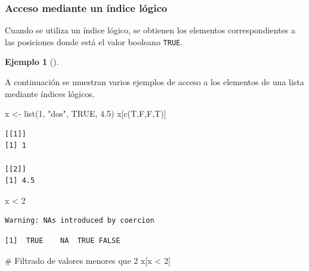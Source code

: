 \documentclass[
  a4paper,
]{scrreport}
\newenvironment{Shaded}{\begin{snugshade}}{\end{snugshade}}
\newcommand{\CommentTok}[1]{\textcolor[rgb]{0.37,0.37,0.37}{#1}}
\newcommand{\ConstantTok}[1]{\textcolor[rgb]{0.56,0.35,0.01}{#1}}
\newcommand{\DecValTok}[1]{\textcolor[rgb]{0.68,0.00,0.00}{#1}}
\newcommand{\FloatTok}[1]{\textcolor[rgb]{0.68,0.00,0.00}{#1}}
\newcommand{\FunctionTok}[1]{\textcolor[rgb]{0.28,0.35,0.67}{#1}}
\newcommand{\NormalTok}[1]{\textcolor[rgb]{0.00,0.23,0.31}{#1}}
\newcommand{\OtherTok}[1]{\textcolor[rgb]{0.00,0.23,0.31}{#1}}
\newcommand{\SpecialCharTok}[1]{\textcolor[rgb]{0.37,0.37,0.37}{#1}}
\newcommand{\StringTok}[1]{\textcolor[rgb]{0.13,0.47,0.30}{#1}}
\theoremstyle{definition}
\theoremstyle{definition}
\newtheorem{example}{Ejemplo}[chapter]
\theoremstyle{remark}
\begin{document}
\hypertarget{acceso-mediante-un-uxedndice-luxf3gico-1}{%
\subsubsection{Acceso mediante un índice
lógico}\label{acceso-mediante-un-uxedndice-luxf3gico-1}}

Cuando se utiliza un índice lógico, se obtienen los elementos
correspondientes a las posiciones donde está el valor booleano
\texttt{TRUE}.

\leavevmode{}%
\begin{example}[]\label{exm-acceso-listas-logico}

A continuación se muestran varios ejemplos de acceso a los elementos de
una lista mediante índices lógicos.

\begin{Shaded}
\begin{Highlighting}[]
\NormalTok{x }\OtherTok{\textless{}{-}} \FunctionTok{list}\NormalTok{(}\DecValTok{1}\NormalTok{, }\StringTok{"dos"}\NormalTok{, }\ConstantTok{TRUE}\NormalTok{, }\FloatTok{4.5}\NormalTok{)}
\NormalTok{x[}\FunctionTok{c}\NormalTok{(T,F,F,T)]}
\end{Highlighting}
\end{Shaded}

\begin{verbatim}
[[1]]
[1] 1

[[2]]
[1] 4.5
\end{verbatim}

\begin{Shaded}
\begin{Highlighting}[]
\NormalTok{x }\SpecialCharTok{\textless{}} \DecValTok{2}
\end{Highlighting}
\end{Shaded}

\begin{verbatim}
Warning: NAs introduced by coercion
\end{verbatim}

\begin{verbatim}
[1]  TRUE    NA  TRUE FALSE
\end{verbatim}

\begin{Shaded}
\begin{Highlighting}[]
\CommentTok{\# Filtrado de valores menores que 2}
\NormalTok{x[x }\SpecialCharTok{\textless{}} \DecValTok{2}\NormalTok{]}
\end{Highlighting}
\end{Shaded}


\end{example}
\end{document}
